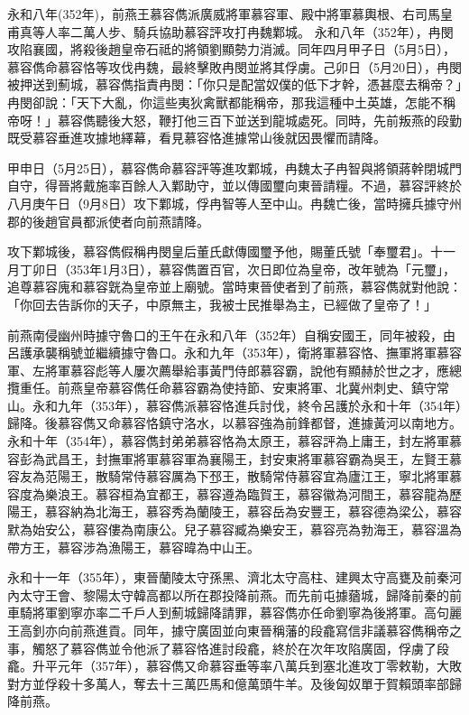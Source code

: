 永和八年(352年)，前燕王慕容儁派廣威將軍慕容軍、殿中將軍慕輿根、右司馬皇甫真等人率二萬人步、騎兵協助慕容評攻打冉魏鄴城。 永和八年（352年），冉閔攻陷襄國，將殺後趙皇帝石祗的將領劉顯勢力消滅。同年四月甲子日（5月5日），慕容儁命慕容恪等攻伐冉魏，最終擊敗冉閔並將其俘虜。己卯日（5月20日），冉閔被押送到薊城，慕容儁指責冉閔：「你只是配當奴僕的低下才幹，憑甚麼去稱帝？」冉閔卻說：「天下大亂，你這些夷狄禽獸都能稱帝，那我這種中土英雄，怎能不稱帝呀！」慕容儁聽後大怒，鞭打他三百下並送到龍城處死。同時，先前叛燕的段勤既受慕容垂進攻據地繹幕，看見慕容恪進據常山後就因畏懼而請降。

甲申日（5月25日），慕容儁命慕容評等進攻鄴城，冉魏太子冉智與將領蔣幹閉城門自守，得晉將戴施率百餘人入鄴助守，並以傳國璽向東晉請糧。不過，慕容評終於八月庚午日（9月8日）攻下鄴城，俘冉智等人至中山。冉魏亡後，當時擁兵據守州郡的後趙官員都派使者向前燕請降。

攻下鄴城後，慕容儁假稱冉閔皇后董氏獻傳國璽予他，賜董氏號「奉璽君」。十一月丁卯日（353年1月3日），慕容儁置百官，次日即位為皇帝，改年號為「元璽」，追尊慕容廆和慕容皝為皇帝並上廟號。當時東晉使者到了前燕，慕容儁就對他說：「你回去告訴你的天子，中原無主，我被士民推舉為主，已經做了皇帝了！」

前燕南侵幽州時據守魯口的王午在永和八年（352年）自稱安國王，同年被殺，由呂護承襲稱號並繼續據守魯口。永和九年（353年），衛將軍慕容恪、撫軍將軍慕容軍、左將軍慕容彪等人屢次薦舉給事黃門侍郎慕容霸，說他有顯赫於世之才，應總攬重任。前燕皇帝慕容儁任命慕容霸為使持節、安東將軍、北冀州刺史、鎮守常山。永和九年（353年），慕容儁派慕容恪進兵討伐，終令呂護於永和十年（354年）歸降。後慕容儁又命慕容恪鎮守洛水，以慕容強為前鋒都督，進據黃河以南地方。永和十年（354年），慕容儁封弟弟慕容恪為太原王，慕容評為上庸王，封左將軍慕容彭為武昌王，封撫軍將軍慕容軍為襄陽王，封安東將軍慕容霸為吳王，左賢王慕容友為范陽王，散騎常侍慕容厲為下邳王，散騎常侍慕容宜為廬江王，寧北將軍慕容度為樂浪王。慕容桓為宜都王，慕容遵為臨賀王，慕容徽為河間王，慕容龍為歷陽王，慕容納為北海王，慕容秀為蘭陵王，慕容岳為安豐王，慕容德為梁公，慕容默為始安公，慕容僂為南康公。兒子慕容臧為樂安王，慕容亮為勃海王，慕容溫為帶方王，慕容涉為漁陽王，慕容暐為中山王。

永和十一年（355年），東晉蘭陵太守孫黑、濟北太守高柱、建興太守高甕及前秦河內太守王會、黎陽太守韓高都以所在郡投降前燕。而先前屯據蕕城，歸降前秦的前車騎將軍劉寧亦率二千戶人到薊城歸降請罪，慕容儁亦任命劉寧為後將軍。高句麗王高釗亦向前燕進貢。同年，據守廣固並向東晉稱藩的段龕寫信非議慕容儁稱帝之事，觸怒了慕容儁並令他派了慕容恪進討段龕，終於在次年攻陷廣固，俘虜了段龕。升平元年（357年），慕容儁又命慕容垂等率八萬兵到塞北進攻丁零敕勒，大敗對方並俘殺十多萬人，奪去十三萬匹馬和億萬頭牛羊。及後匈奴單于賀賴頭率部歸降前燕。

